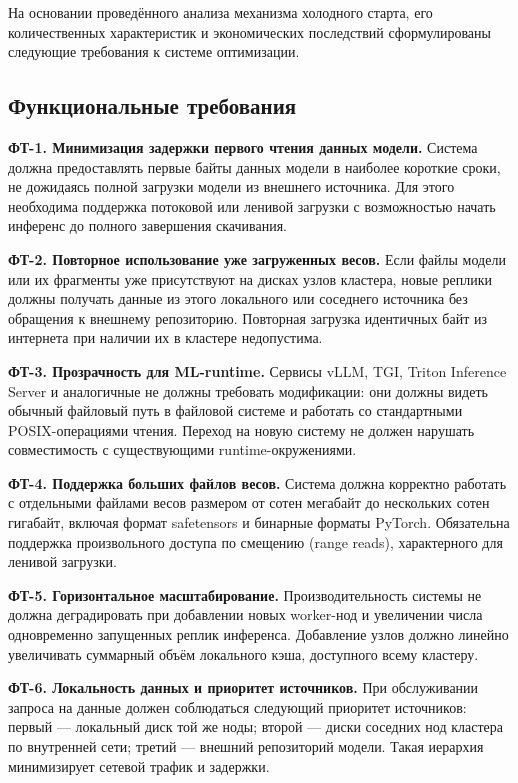 На основании проведённого анализа механизма холодного старта, его количественных характеристик и экономических последствий сформулированы следующие требования к системе оптимизации.

\subsection{Функциональные требования}

\textbf{ФТ-1. Минимизация задержки первого чтения данных модели.} Система должна предоставлять первые байты данных модели в наиболее короткие сроки, не дожидаясь полной загрузки модели из внешнего источника. Для этого необходима поддержка потоковой или ленивой загрузки с возможностью начать инференс до полного завершения скачивания.

\textbf{ФТ-2. Повторное использование уже загруженных весов.} Если файлы модели или их фрагменты уже присутствуют на дисках узлов кластера, новые реплики должны получать данные из этого локального или соседнего источника без обращения к внешнему репозиторию. Повторная загрузка идентичных байт из интернета при наличии их в кластере недопустима.

\textbf{ФТ-3. Прозрачность для ML-runtime.} Сервисы vLLM, TGI, Triton Inference Server и аналогичные не должны требовать модификации: они должны видеть обычный файловый путь в файловой системе и работать со стандартными POSIX-операциями чтения. Переход на новую систему не должен нарушать совместимость с существующими runtime-окружениями.

\textbf{ФТ-4. Поддержка больших файлов весов.} Система должна корректно работать с отдельными файлами весов размером от сотен мегабайт до нескольких сотен гигабайт, включая формат safetensors и бинарные форматы PyTorch. Обязательна поддержка произвольного доступа по смещению (range reads), характерного для ленивой загрузки.

\textbf{ФТ-5. Горизонтальное масштабирование.} Производительность системы не должна деградировать при добавлении новых worker-нод и увеличении числа одновременно запущенных реплик инференса. Добавление узлов должно линейно увеличивать суммарный объём локального кэша, доступного всему кластеру.

\textbf{ФТ-6. Локальность данных и приоритет источников.} При обслуживании запроса на данные должен соблюдаться следующий приоритет источников: первый --- локальный диск той же ноды; второй --- диски соседних нод кластера по внутренней сети; третий --- внешний репозиторий модели. Такая иерархия минимизирует сетевой трафик и задержки.

